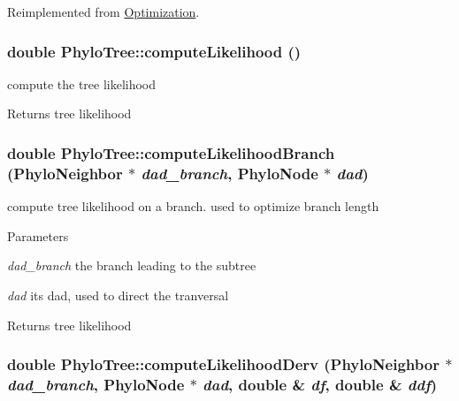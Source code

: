 Reimplemented from \hyperlink{classOptimization_ad7ca7b884076f8c76312d516e23c6609}{Optimization}.\hypertarget{classPhyloTree_a7d6a388ffa393ccf810e8e04718725ec}{
\subsubsection[{computeLikelihood}]{\setlength{\rightskip}{0pt plus 5cm}double PhyloTree::computeLikelihood ()}}
\label{classPhyloTree_a7d6a388ffa393ccf810e8e04718725ec}
compute the tree likelihood \begin{DoxyReturn}{Returns}
tree likelihood 
\end{DoxyReturn}
\hypertarget{classPhyloTree_a375b6b1fe6d56698b804af890a629869}{
\subsubsection[{computeLikelihoodBranch}]{\setlength{\rightskip}{0pt plus 5cm}double PhyloTree::computeLikelihoodBranch ({\bf PhyloNeighbor} $\ast$ {\em dad\_\-branch}, \/  {\bf PhyloNode} $\ast$ {\em dad})}}
\label{classPhyloTree_a375b6b1fe6d56698b804af890a629869}
compute tree likelihood on a branch. used to optimize branch length 
\begin{DoxyParams}{Parameters}
\item[{\em dad\_\-branch}]the branch leading to the subtree \item[{\em dad}]its dad, used to direct the tranversal \end{DoxyParams}
\begin{DoxyReturn}{Returns}
tree likelihood 
\end{DoxyReturn}
\hypertarget{classPhyloTree_a1c21d2ba4fc8755b3435b5677938a0fb}{
\subsubsection[{computeLikelihoodDerv}]{\setlength{\rightskip}{0pt plus 5cm}double PhyloTree::computeLikelihoodDerv ({\bf PhyloNeighbor} $\ast$ {\em dad\_\-branch}, \/  {\bf PhyloNode} $\ast$ {\em dad}, \/  double \& {\em df}, \/  double \& {\em ddf})}}
